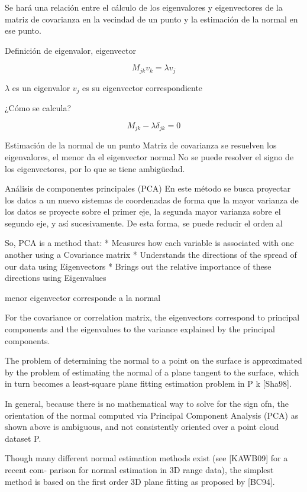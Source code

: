 Se hará una relación entre el cálculo de los eigenvalores y eigenvectores de la matriz de covarianza en la vecindad
de un punto y la estimación de la normal en ese punto.

Definición de eigenvalor, eigenvector

\[ M_{jk} v_k = \lambda v_j \]

$\lambda$ es un eigenvalor
$v_j$ es su eigenvector correspondiente 

¿Cómo se calcula?

\[ M_{jk} - \lambda \delta_{jk} = 0 \]


Estimación de la normal de un punto
Matriz de covarianza
se resuelven los eigenvalores, el menor da el eigenvector normal
No se puede resolver el signo de los eigenvectores, por lo que se tiene ambigüedad.

Análisis de componentes principales (PCA)
En este método se busca proyectar los datos a un nuevo sistemas de coordenadas
de forma que la mayor varianza de los datos se proyecte sobre el primer eje,
la segunda mayor varianza sobre el segundo eje, y así sucesivamente.
De esta forma, se puede reducir el orden al 


So, PCA is a method that:
	* Measures how each variable is associated with one another using a Covariance matrix
	* Understands the directions of the spread of our data using Eigenvectors
	* Brings out the relative importance of these directions using Eigenvalues

menor eigenvector corresponde a la normal


For the covariance or correlation matrix, the eigenvectors correspond to
principal components and the eigenvalues to the variance explained by the
principal components.

The problem of determining the normal to a point on
the surface is approximated by the problem of estimating the normal of a plane tangent to the
surface, which in turn becomes a least-square plane fitting estimation problem in P
k [Sha98].

In general, because there is no mathematical way to solve for the sign of⃗n, the orientation of
the normal computed via Principal Component Analysis (PCA) as shown above is ambiguous,
and not consistently oriented over a point cloud dataset P.


Though many different normal estimation methods exist (see [KAWB09] for a recent com-
parison for normal estimation in 3D range data), the simplest method is based on the first order
3D plane fitting as proposed by [BC94].
